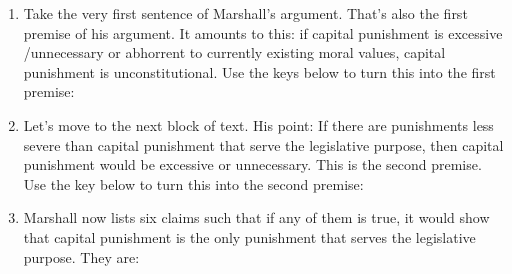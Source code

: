 \begin{enumerate}[leftmargin=*]
 \setlength{\itemsep}{1.5em}
 \item Take the very first sentence of Marshall's argument. That's also the 
  first premise of his argument. It amounts to this: if capital punishment is 
  excessive /unnecessary or abhorrent to currently existing moral values, 
  capital punishment is unconstitutional. Use the keys below to turn this into 
  the first premise: 

 \item Let's move to the next block of text. His point: If there are punishments 
  less severe than capital punishment that serve the legislative purpose, then 
  capital punishment would be excessive or unnecessary.  This is the second 
  premise. Use the key below to turn this into the second premise:



\item Marshall now lists six claims such that if any of them is true, it would 
 show  that capital punishment is the only punishment that serves the 
 legislative purpose.  They are:

\end{enumerate}
